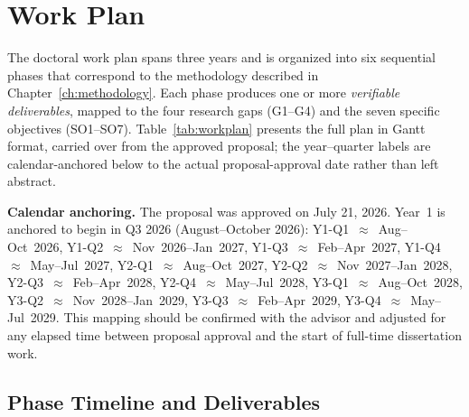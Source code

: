 \documentclass[12pt,a4paper]{report}
\begin{document}
\chapter{Work Plan}
\label{ch:workplan}
\label{sec:workplan}

The doctoral work plan spans three years and is organized into six sequential phases that correspond to the methodology described in Chapter~\ref{ch:methodology}. Each phase produces one or more \emph{verifiable deliverables}, mapped to the four research gaps (G1--G4) and the seven specific objectives (SO1--SO7). Table~\ref{tab:workplan} presents the full plan in Gantt
format, carried over from the approved proposal; the year--quarter labels are calendar-anchored below to the actual proposal-approval date rather than left abstract.

\noindent\textbf{Calendar anchoring.} The proposal was approved on July 21, 2026. Year~1 is anchored to begin in Q3 2026 (August--October 2026): Y1-Q1~$\approx$~Aug--Oct~2026, Y1-Q2~$\approx$~Nov~2026--Jan~2027, Y1-Q3~$\approx$~Feb--Apr~2027, Y1-Q4~$\approx$~May--Jul~2027, Y2-Q1~$\approx$~Aug--Oct~2027, Y2-Q2~$\approx$~Nov~2027--Jan~2028, Y2-Q3~$\approx$~Feb--Apr~2028, Y2-Q4~$\approx$~May--Jul~2028, Y3-Q1~$\approx$~Aug--Oct~2028, Y3-Q2~$\approx$~Nov~2028--Jan~2029, Y3-Q3~$\approx$~Feb--Apr~2029, Y3-Q4~$\approx$~May--Jul~2029. This mapping should be confirmed with the advisor and adjusted for any elapsed time between proposal approval and the start of full-time dissertation work.

\section{Phase Timeline and Deliverables}
\end{document}
